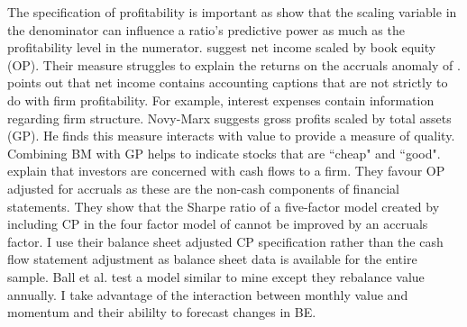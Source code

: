 The specification of profitability is important as \textcite{ball2015deflating}
show that the scaling variable in the denominator can influence a ratio's
predictive power as much as the profitability level in the numerator.
\textcite{fama2006profitability} suggest net income scaled by
book equity (OP).
Their measure struggles to explain the returns on the accruals anomaly of
\textcite{sloan1996stock}.
\textcite{novy2013other} points out that net income contains accounting
captions that are not strictly to do with firm profitability.
For example, interest expenses contain information regarding firm structure.
Novy-Marx suggests gross profits scaled by total assets (GP).
He finds this measure interacts with value to provide a measure of quality.
Combining BM with GP helps to indicate stocks that are ``cheap" and ``good".
\textcite{ball2016accruals} explain that investors are concerned with cash
flows to a firm.
They favour OP adjusted for accruals as these are the non-cash components of
financial statements.
They show that the Sharpe ratio of a five-factor model created by including CP
in the four factor model of \textcite{carhart1997persistence} cannot be
improved by an accruals factor.
I use their balance sheet adjusted CP specification rather than the cash flow
statement adjustment as balance sheet data is available for the entire sample.
Ball et al. test a model similar to mine except they rebalance value annually.
I take advantage of the interaction between monthly value and momentum and
their abililty to forecast changes in BE.


